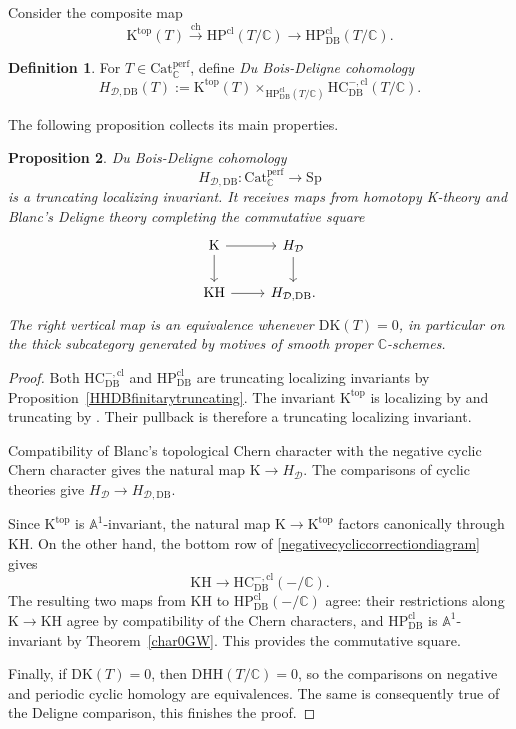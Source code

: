 \documentclass{amsart}
\theoremstyle{plain}
\newtheorem{prop}{Proposition}[section]
\theoremstyle{definition}
\newtheorem{defi}[prop]{Definition}
\newcommand{\lra}{\longrightarrow}
\newcommand{\bbA}{\mathbb{A}}
\newcommand{\bbC}{\mathbb{C}}
\newcommand{\Catperf}{\mathrm{Cat}^{\mathrm{perf}}}
\newcommand{\HC}{\mathrm{HC}}
\newcommand{\HP}{\mathrm{HP}}
\newcommand{\K}{\mathrm{K}}
\newcommand{\KH}{\mathrm{KH}}
\newcommand{\DK}{\mathrm{DK}}
\newcommand{\DHH}{\mathrm{DHH}}
\newcommand{\Sp}{\mathrm{Sp}}
\DeclareMathOperator{\ch}{ch}
\newcommand{\DB}{\mathrm{DB}}
\newcommand{\cl}{\mathrm{cl}}
\begin{document}
Consider the composite map
\[
\K^{\mathrm{top}}(T)\xrightarrow{\ch}\HP^{\cl}(T/\bbC)
\longrightarrow \HP^{\cl}_{\DB}(T/\bbC).
\]

\begin{defi}\label{DBDelignedefinition}
For $T\in\Catperf_\bbC$, define \emph{Du Bois-Deligne cohomology}
\[
H_{\mathcal D,\DB}(T):=
\K^{\mathrm{top}}(T)\mathop{\times}_{\HP^{\cl}_{\DB}(T/\bbC)}
\HC^{-,\cl}_{\DB}(T/\bbC).
\]
\end{defi}

The following proposition collects its main properties.

\begin{prop}\label{Deligneproperties}
Du Bois-Deligne cohomology
\[
H_{\mathcal D,\DB}: \Catperf_\bbC \lra \Sp
\]
is a truncating localizing invariant. It receives maps from homotopy K-theory and Blanc's Deligne theory completing the commutative square
\[
\begin{tikzcd}
\K\arrow[r]\arrow[d]&H_\mathcal{D}\arrow[d]\\
\KH\arrow[r]&H_{\mathcal{D},\DB}.
\end{tikzcd}
\]
The right vertical map is an equivalence whenever $\DK(T)=0$, in particular on the thick subcategory generated by motives of smooth proper $\bbC$-schemes.

\end{prop}


\begin{proof}
Both $\HC^{-,\cl}_{\DB}$ and $\HP^{\cl}_{\DB}$ are truncating localizing invariants by Proposition~\ref{HHDBfinitarytruncating}.
The invariant $\K^{\mathrm{top}}$ is localizing by
\cite[Proposition 4.15]{Bla16} and truncating by
\cite[Theorem 5.5]{Kon21}. Their pullback is therefore a truncating localizing invariant.

Compatibility of Blanc's topological Chern character with the negative cyclic Chern character gives the natural map
$\K\to H_{\mathcal D}$. The comparisons of cyclic theories give $H_{\mathcal D}\to H_{\mathcal D,\DB}$.

Since $\K^{\mathrm{top}}$ is $\bbA^1$-invariant, the natural map
$\K\to \K^{\mathrm{top}}$ factors canonically through $\KH$.
On the other hand, the bottom row of
\eqref{negativecycliccorrectiondiagram} gives
\[
\KH\longrightarrow \HC^{-,\cl}_{\DB}(-/\bbC).
\]
The resulting two maps from $\KH$ to $\HP^{\cl}_{\DB}(-/\bbC)$
agree: their restrictions along $\K\to \KH$ agree by compatibility of the Chern characters, and
$\HP^{\cl}_{\DB}$ is $\bbA^1$-invariant by Theorem~\ref{char0GW}.
This provides the commutative square.

Finally, if $\DK(T)=0$, then $\DHH(T/\bbC)=0$, so the comparisons on negative and periodic cyclic homology are equivalences. The same is consequently true of the Deligne comparison, this finishes the proof.
\end{proof}
\end{document}
